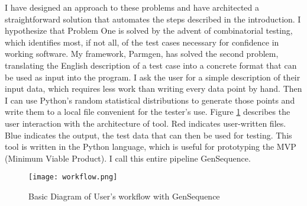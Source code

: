 I have designed an approach to these problems and have architected a straightforward solution that automates the steps described in the introduction. I hypothesize that Problem One is solved by the advent of combinatorial testing, which identifies most, if not all, of the test cases necessary for confidence in working software. My framework, Parmgen, has solved the second problem, translating the English description of a test case into a concrete format that can be used as input into the program. I ask the user for a simple description of their input data, which requires less work than writing every data point by hand. Then I can use Python's random statistical distributions to generate those points and write them to a local file convenient for the tester's use. Figure \ref{fig:workflo} describes the user interaction with the architecture of tool. Red indicates user-written files. Blue indicates the output, the test data that can then be used for testing. This tool is written in the Python language, which is useful for prototyping the MVP (Minimum Viable Product). I call this entire pipeline GenSequence.

\begin{figure}[H]
\centering
\texttt{[image: workflow.png]}
\caption{Basic Diagram of User's workflow with GenSequence}
\label{fig:workflo}
\end{figure}